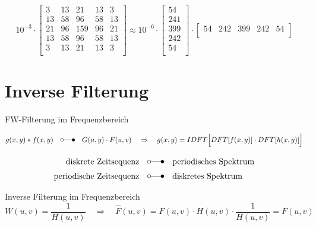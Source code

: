 \documentclass{article}
\begin{document}
\begin{equation}
    10^{-3} \cdot
    \begin{bmatrix}
        3 & 13 & 21 & 13 & 3  \\
        13 & 58 & 96 & 58 & 13 \\
        21 & 96 & 159 & 96 & 21\\    
        13 & 58 & 96 & 58 & 13 \\
        3 & 13  & 21 & 13 & 3 \\
    \end{bmatrix}
    \approx   
    10^{-6} \cdot 
    \begin{bmatrix}
        54 \\
        241 \\
        399 \\
        242 \\
        54 \\
    \end{bmatrix}
    \cdot
    \begin{bmatrix}
          54 & 242 & 399 & 242 & 54 \\
    \end{bmatrix}
\end{equation}


\newpage
\section{Inverse Filterung}

FW-Filterung im Frequenzbereich

\begin{equation}
    g(x,y)*f(x,y) \quad \laplace \quad G(u,y) \cdot F(u,v)
\quad \Rightarrow \quad
    g(x,y) = IDFT\Big[DFT[f(x,y)] \cdot DFT[h(x,y)]\Big]
\end{equation}


\begin{align*}
    \text{diskrete Zeitsequenz} \quad &\laplace \quad \text{periodisches Spektrum} \\
    \text{periodische Zeitsequenz} \quad &\laplace \quad \text{diskretes Spektrum}
\end{align*}


Inverse Filterung im Frequenzbereich
\begin{equation}
    W(u,v) = \frac{1}{H(u,v)}
    \quad \Rightarrow \quad
    \hat{F}(u,v) = F(u,v) \cdot H(u,v) \cdot \frac{1}{H(u,v)} = F(u,v)
\end{equation}
\end{document}
